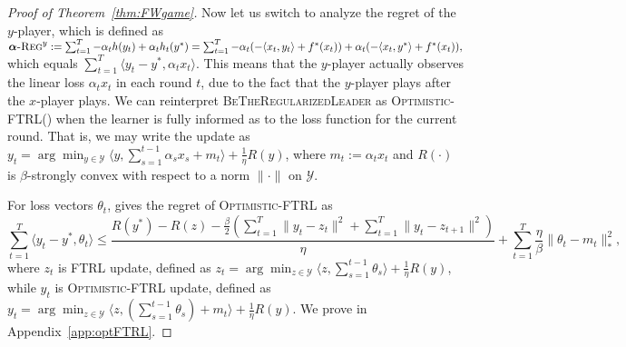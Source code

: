 \documentclass[pmlr]{jmlr} %
\def\balpha{\boldsymbol{\alpha}}
\def\BTRL{\textsc{BeTheRegularizedLeader}\xspace}
\def\OFTRL{\textsc{Optimistic-FTRL}\xspace}
\newcommand{\regret}[1]{\balpha\textsc{-Reg}^{#1}}
\newcommand{\YY}{\mathcal{Y}}
\begin{document}
\begin{proof}[Proof of Theorem~\ref{thm:FWgame}]
	Now let us switch to analyze the regret of the $y$-player, which is defined as
$\textstyle	\regret{y}   :=  \sum_{t=1}^{T} - \alpha_{t} h(y_{t}) + \alpha_{t} h_{t}(y^{*})
	= \sum_{t=1}^{T} -\alpha_{t}  ( - \langle x_{t}, y_{t} \rangle + f^{*}(x_{t}) ) + \alpha_{t} (- \langle x_{t}, y^{*} \rangle + f^{*}(x_{t}) ),$
	which equals $\sum_{t=1}^{T} \langle y_{t} - y^{*}, \alpha_{t} x_{t} \rangle$.
	This means that the $y$-player actually observes the linear loss $\alpha_{t} x_{t}$ in each round $t$, due to the fact that the $y$-player plays after the $x$-player plays. 
	We can reinterpret \BTRL as \OFTRL (\cite{SALS15}) when the learner is fully informed as to the loss function for the current round. That is, we may write the update as
	$y_{t} = \arg\min_{y \in \YY} \langle y , \sum_{s=1}^{t-1} \alpha_{s} x_{s} + m_{t} \rangle + \frac{1}{\eta} R(y)$, where $m_{t}:=\alpha_{t} x_{t}$ and $R(\cdot)$ is $\beta$-strongly convex with respect to a norm $\|\cdot\|$ on $\YY$.
	
	For loss vectors $\theta_{t}$,  gives the regret of \OFTRL as 
	\begin{equation} 
\textstyle\sum_{t=1}^{T} \langle y_{t} - y^{*}, \theta_{t} \rangle 
	\leq \frac{ R(y^{*}) - R(z)- 
\frac{\beta}{2} (\sum_{{t=1}}^{T} \| y_{t} - z_{t} \|^{2} + \sum_{{t=1}}^{T} \| y_{t} - z_{t+1} \|^{2})}{\eta} +
	\sum_{t=1}^{T} \frac{\eta}{\beta} \| \theta_{t} - m_{t} \|^{2}_{*} ,
	\end{equation}
	where $z_{{t}}$ is FTRL update, defined as $z_{t} = \arg\min_{z \in \YY}  \langle z, \sum_{s=1}^{t-1} \theta_{s} \rangle +  \frac{1}{\eta} R(y)$, while $y_{t}$ is \OFTRL update, defined as 
	$y_{t} = \arg\min_{z \in \YY}  \langle z, ( \sum_{s=1}^{t-1} \theta_{s} )  + m_{t} \rangle  + \frac{1}{\eta} R(y)$.
     We prove  in Appendix~\ref{app:optFTRL}.
	

\end{proof}
\end{document}
